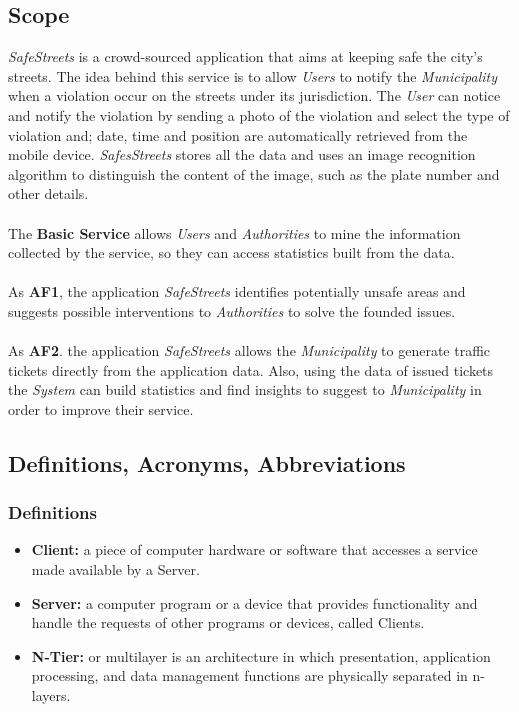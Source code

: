 \documentclass{article}
\begin{document}
	\subsection{Scope}
	{\it SafeStreets} is a crowd-sourced application that aims at keeping safe the city's streets. The idea behind this service is to allow {\it Users} to notify the {\it Municipality} when a violation occur on the streets under its jurisdiction. The {\it User} can notice and notify the violation by sending a photo of the violation and select the type of violation and; date, time and position are automatically retrieved from the mobile device. {\it SafesStreets} stores all the data and uses an image recognition algorithm to distinguish the content of the image, such as the plate number and other details. \\ \\
	The {\bf Basic Service} allows {\it Users} and {\it Authorities} to mine the information \mbox{collected} by the service, so they can access statistics built from the data. \\ \\
	As {\bf AF1}, the application {\it SafeStreets} identifies potentially unsafe areas and \mbox{suggests} possible interventions to {\it Authorities} to solve the founded issues. \\ \\ 
	As {\bf AF2}. the application {\it SafeStreets} allows the {\it Municipality} to generate \mbox{traffic} tickets directly from the application data. Also, using the data of issued tickets the {\it System} can build statistics and find insights to suggest to {\it Municipality} in order to improve their service.
		
	\subsection{Definitions, Acronyms, Abbreviations}
		\subsubsection{Definitions}
			\begin{itemize}
				\item {\bf Client:} a piece of computer hardware or software that accesses a service made available by a Server. 
				\item {\bf Server:} a computer program or a device that provides functionality and handle the requests of other programs or devices, called Clients. 
				\item {\bf N-Tier:} or multilayer is an architecture in which presentation, application processing, and data management functions are physically separated in n-layers. 
			\end{itemize}
	
\end{document}

